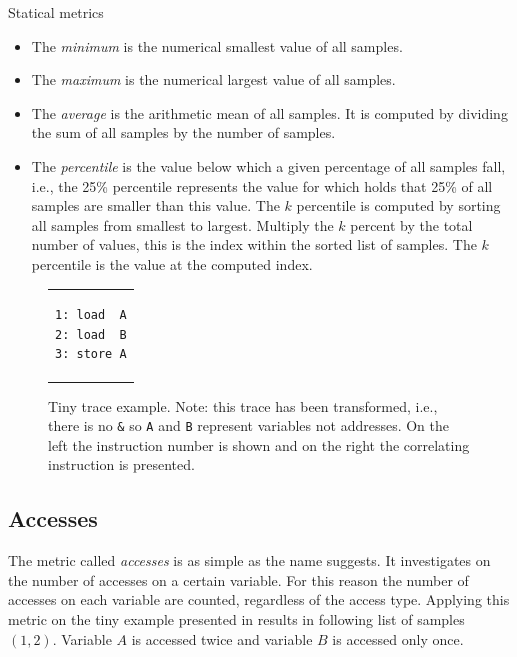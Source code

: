 \documentclass[onecolumn, openright, master, english, signatures]{dbrgrptt}
\begin{document}
\begin{remark} Statical metrics\
\begin{itemize}
\item The \emph{minimum} is the numerical smallest value of all samples.
\item The \emph{maximum} is the numerical largest value of all samples.
\item The \emph{average} is the arithmetic mean of all samples. It is computed by dividing the sum of all samples by the number of samples.
\item The \emph{percentile} is the value below which a given percentage of all samples fall, i.e., the 25\% percentile represents the value for which holds that 25\% of all samples are smaller than this value.
The $k$ percentile is computed by sorting all samples from smallest to largest.
Multiply the $k$ percent by the total number of values, this is the index within the sorted list of samples.
The $k$ percentile is the value at the computed index.
\end{itemize}
\end{remark}

\begin{figure}[!ht]
  \centering
  \begin{tabular}{c}
  \begin{lstlisting}
1: load  A
2: load  B
3: store A
  \end{lstlisting}
  \end{tabular}
  \caption{Tiny \ac{trace} example. Note: this trace has been transformed, i.e., there is no \texttt{\&} so \texttt{A} and \texttt{B} represent variables not addresses. On the left the instruction number is shown and on the right the correlating instruction is presented.}
  \label{fig:metrics-exmaple}
\end{figure}

\subsection{Accesses}\label{ssec:metric-accesses}
The metric called \emph{accesses} is as simple as the name suggests.
It investigates on the number of accesses on a certain variable.
For this reason the number of accesses on each variable are counted, regardless of the access type.
Applying this metric on the tiny example presented in \Cref{fig:metrics-exmaple} results in following list of samples $(1, 2)$.
Variable $A$ is accessed twice and variable $B$ is accessed only once.
\end{document}
